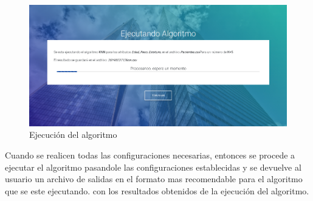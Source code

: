 \\
\begin{figure}[H]
	\hypertarget{fig:red}{\hspace{1pt}}
	\begin{center}
		\includegraphics[width=.9\textwidth]{capitulo7/images/ejecutar.png}
		\caption{Ejecución del algoritmo}
		\label{fig:pond}
	\end{center}
\end{figure}
Cuando se realicen todas las configuraciones necesarias, entonces se procede a ejecutar el algoritmo pasandole las configuraciones establecidas y se devuelve al usuario un archivo de salidas en el formato mas recomendable para el algoritmo que se este ejecutando. con los resultados obtenidos de la ejecución del algoritmo.